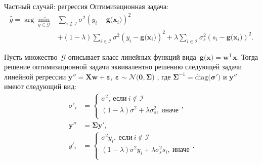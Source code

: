 \documentclass[9pt,pdf,hyperref={unicode}]{beamer}
\begin{document}
\begin{frame}{Частный случай: регрессия}
\justifying
Оптимизационная задача:
\[
\begin{aligned}
\hat{g} = \arg\min_{g\in \mathcal{G}} & \sum_{i\not\in \mathcal{I}}\sigma^2\left(y_i-\mathbf{g}\bigr(\mathbf{x}_i\bigr)\right)^2 \\
&+ \left(1-\lambda\right)\sum_{i\in \mathcal{I}}\sigma^2\left(y_i-\mathbf{g}\bigr(\mathbf{x}_i\bigr)\right)^2 + \lambda\sum_{i\in \mathcal{I}}\sigma_s^2\left(s_i-\mathbf{g}\bigr(\mathbf{x}_i\bigr)\right)^2.
\end{aligned}
\]

\begin{theorem}[Грабовой 2020]
\label{theorem:st:reg}
Пусть множество~$\mathcal{G}$ описывает класс линейных функций вида~$\mathbf{g}\bigr(\mathbf{x}\bigr) = \mathbf{w}^{\mathsf{T}}\mathbf{x}.$ Тогда решение оптимизационной задачи эквивалентно решению следующей задачи линейной регрессии $\mathbf{y''} = \mathbf{X}\mathbf{w} + \bm{\varepsilon},~\bm{\varepsilon} \sim \mathcal{N}\bigr(\mathbf{0}, \bm{\Sigma}\bigr)$ ,
где $\bm{\Sigma}^{-1}=\text{diag}\bigr(\bm{\sigma'}\bigr)$ и $\mathbf{y''}$ имеют следующий вид:
\[
\begin{aligned}
\sigma'_{i} &= \begin{cases}
\sigma^2,~\text{если}~i \not \in \mathcal{I}\\
\left(1-\lambda\right)\sigma^2+\lambda\sigma_s^2,~\text{иначе}\\
\end{cases}, \\
\mathbf{y''} &= \bm{\Sigma}\mathbf{y'},\\
y'_i &= \begin{cases}
\sigma^2y_i,~\text{если}~i \not \in \mathcal{I}\\
\left(1-\lambda\right)\sigma^2y_i+\lambda\sigma_s^2s_i,~\text{иначе}\\
\end{cases}.
\end{aligned}
\]
\end{theorem}
\end{frame}
\end{document}
